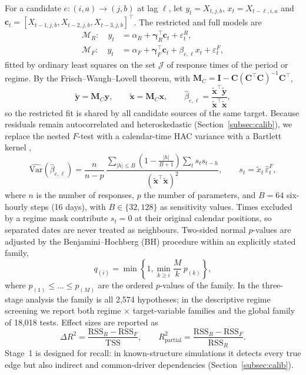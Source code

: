 \documentclass[preprint,12pt]{elsarticle}
\begin{document}
For a candidate $e:(i,a)\rightarrow(j,b)$ at lag $\ell$, let $y_t=X_{t,j,b}$, $x_t=X_{t-\ell,i,a}$ and $\mathbf{c}_t=[X_{t-1,j,b},X_{t-2,j,b},X_{t-3,j,b}]^{\top}$. The restricted and full models are
\begin{align}
\mathcal{M}_{R}:\quad y_t&=\alpha_R+\boldsymbol{\gamma}_R^{\top}\mathbf{c}_t+\varepsilon^{R}_t,\\
\mathcal{M}_{F}:\quad y_t&=\alpha_F+\boldsymbol{\gamma}_F^{\top}\mathbf{c}_t+\beta_{e,\ell}x_t+\varepsilon^{F}_t,
\end{align}
fitted by ordinary least squares on the set $\mathcal{J}$ of response times of the period or regime. By the Frisch--Waugh--Lovell theorem, with $\mathbf{M}_C=\mathbf{I}-\mathbf{C}(\mathbf{C}^{\top}\mathbf{C})^{-1}\mathbf{C}^{\top}$,
\begin{equation}
\widetilde{\mathbf{y}}=\mathbf{M}_C\mathbf{y},\qquad\widetilde{\mathbf{x}}=\mathbf{M}_C\mathbf{x},\qquad\widehat{\beta}_{e,\ell}=\frac{\widetilde{\mathbf{x}}^{\top}\widetilde{\mathbf{y}}}{\widetilde{\mathbf{x}}^{\top}\widetilde{\mathbf{x}}},
\end{equation}
so the restricted fit is shared by all candidate sources of the same target. Because residuals remain autocorrelated and heteroskedastic (Section~\ref{subsec:calib}), we replace the nested $F$-test with a calendar-time HAC variance with a Bartlett kernel \citep{Lazarus2021HAR},
\begin{equation}
\widehat{\mathrm{Var}}(\widehat{\beta}_{e,\ell})=\frac{n}{n-p}\,\frac{\sum_{|h|\le B}\left(1-\frac{|h|}{B+1}\right)\sum_{t}s_t s_{t-h}}{\left(\widetilde{\mathbf{x}}^{\top}\widetilde{\mathbf{x}}\right)^{2}},\qquad s_t=\widetilde{x}_t\,\widehat{\varepsilon}^{F}_t,
\label{eq:hac}
\end{equation}
where $n$ is the number of responses, $p$ the number of parameters, and $B=64$ six-hourly steps (16 days), with $B\in\{32,128\}$ as sensitivity values. Times excluded by a regime mask contribute $s_t=0$ at their original calendar positions, so separated dates are never treated as neighbours. Two-sided normal $p$-values are adjusted by the Benjamini--Hochberg (BH) procedure \citep{Benjamini1995} within an explicitly stated family,
\begin{equation}
q_{(i)}=\min\left\{1,\min_{k\ge i}\frac{M}{k}\,p_{(k)}\right\},
\end{equation}
where $p_{(1)}\le\dots\le p_{(M)}$ are the ordered $p$-values of the family. In the three-stage analysis the family is all 2,574 hypotheses; in the descriptive regime screening we report both regime $\times$ target-variable families and the global family of 18,018 tests. Effect sizes are reported as
\begin{equation}
\Delta R^2=\frac{\mathrm{RSS}_R-\mathrm{RSS}_F}{\mathrm{TSS}},\qquad
R^2_{\mathrm{partial}}=\frac{\mathrm{RSS}_R-\mathrm{RSS}_F}{\mathrm{RSS}_R}.
\end{equation}
Stage~1 is designed for recall: in known-structure simulations it detects every true edge but also indirect and common-driver dependencies (Section~\ref{subsec:calib}).
\end{document}
